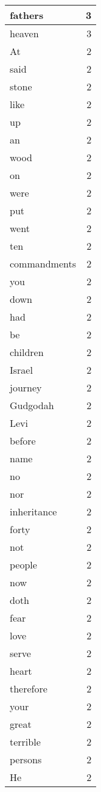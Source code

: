 \begin{center}
\begin{longtable}{l|r}
fathers & 3 \\ \hline
heaven & 3 \\ \hline
At & 2 \\ \hline
said & 2 \\ \hline
stone & 2 \\ \hline
like & 2 \\ \hline
up & 2 \\ \hline
an & 2 \\ \hline
wood & 2 \\ \hline
on & 2 \\ \hline
were & 2 \\ \hline
put & 2 \\ \hline
went & 2 \\ \hline
ten & 2 \\ \hline
commandments & 2 \\ \hline
you & 2 \\ \hline
down & 2 \\ \hline
had & 2 \\ \hline
be & 2 \\ \hline
children & 2 \\ \hline
Israel & 2 \\ \hline
journey & 2 \\ \hline
Gudgodah & 2 \\ \hline
Levi & 2 \\ \hline
before & 2 \\ \hline
name & 2 \\ \hline
no & 2 \\ \hline
nor & 2 \\ \hline
inheritance & 2 \\ \hline
forty & 2 \\ \hline
not & 2 \\ \hline
people & 2 \\ \hline
now & 2 \\ \hline
doth & 2 \\ \hline
fear & 2 \\ \hline
love & 2 \\ \hline
serve & 2 \\ \hline
heart & 2 \\ \hline
therefore & 2 \\ \hline
your & 2 \\ \hline
great & 2 \\ \hline
terrible & 2 \\ \hline
persons & 2 \\ \hline
He & 2 \\ \hline

\end{longtable}
\end{center}
